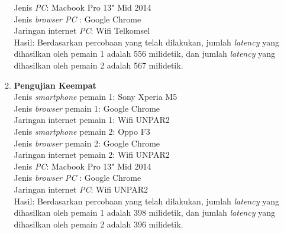 \begin{enumerate}
\begin{enumerate}
		Jenis \textit{PC}: Macbook Pro 13" Mid 2014\\
		Jenis \textit{browser PC} : Google Chrome\\
		Jaringan internet \textit{PC}: Wifi Telkomsel\\
		
		Hasil: Berdasarkan percobaan yang telah dilakukan, jumlah \textit{latency} yang dihasilkan oleh pemain 1 adalah 556 milidetik, dan jumlah \textit{latency} yang dihasilkan oleh pemain 2 adalah 567 milidetik.
		
		\item \textbf{Pengujian Keempat} \\ 
		Jenis \textit{smartphone} pemain 1: Sony Xperia M5\\
		Jenis \textit{browser} pemain 1: Google Chrome\\
		Jaringan internet pemain 1: Wifi UNPAR2\\
		
		Jenis \textit{smartphone} pemain 2: Oppo F3\\
		Jenis \textit{browser} pemain 2: Google Chrome\\
		Jaringan internet pemain 2: Wifi UNPAR2\\
		
		Jenis \textit{PC}: Macbook Pro 13" Mid 2014\\
		Jenis \textit{browser PC} : Google Chrome\\
		Jaringan internet \textit{PC}: Wifi UNPAR2\\
		
		Hasil: Berdasarkan percobaan yang telah dilakukan, jumlah \textit{latency} yang dihasilkan oleh pemain 1 adalah 398 milidetik, dan jumlah \textit{latency} yang dihasilkan oleh pemain 2 adalah 396 milidetik.
		

\end{enumerate}
\end{enumerate}
